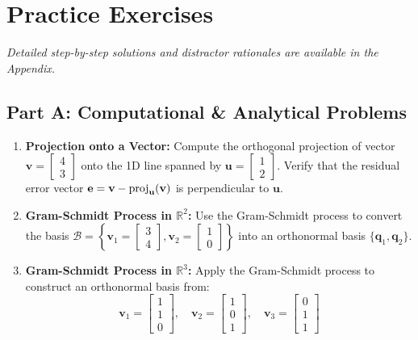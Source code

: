 \newpage
\section{Practice Exercises}
\textit{Detailed step-by-step solutions and distractor rationales are available in the Appendix.}

\subsection*{Part A: Computational \& Analytical Problems}
\begin{enumerate}
\item \textbf{Projection onto a Vector:} Compute the orthogonal projection of vector $\mathbf{v} = \begin{bmatrix} 4 \\ 3 \end{bmatrix}$ onto the 1D line spanned by $\mathbf{u} = \begin{bmatrix} 1 \\ 2 \end{bmatrix}$. Verify that the residual error vector $\mathbf{e} = \mathbf{v} - \operatorname{proj}_{\mathbf{u}}(\mathbf{v})$ is perpendicular to $\mathbf{u}$.

\item \textbf{Gram-Schmidt Process in $\mathbb{R}^2$:} Use the Gram-Schmidt process to convert the basis $\mathcal{B} = \left\{ \mathbf{v}_1 = \begin{bmatrix} 3 \\ 4 \end{bmatrix}, \mathbf{v}_2 = \begin{bmatrix} 1 \\ 0 \end{bmatrix} \right\}$ into an orthonormal basis $\{\mathbf{q}_1, \mathbf{q}_2\}$.

\item \textbf{Gram-Schmidt Process in $\mathbb{R}^3$:} Apply the Gram-Schmidt process to construct an orthonormal basis from:
\begin{equation*}
\mathbf{v}_1 = \begin{bmatrix} 1 \\ 1 \\ 0 \end{bmatrix}, \quad \mathbf{v}_2 = \begin{bmatrix} 1 \\ 0 \\ 1 \end{bmatrix}, \quad \mathbf{v}_3 = \begin{bmatrix} 0 \\ 1 \\ 1 \end{bmatrix}
\end{equation*}


\end{enumerate}
